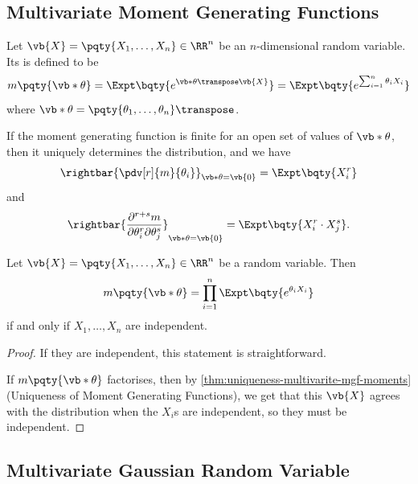 \subsection{Multivariate Moment Generating Functions}

\begin{definition}
    \label{def:multivariate-mgf}%
    Let \(\vb{X} = \pqty{X_1, \ldots, X_n} \in \RR^n\) be an \(n\)-dimensional random variable. Its  is defined to be
    \[
        m\pqty{\vb*{\theta}} = \Expt\bqty{e^{\vb*{\theta}\transpose \vb{X}}} = \Expt\bqty{e^{\sum_{i = 1}^{n} \theta_i X_i}}
    \]
    where \(\vb*{\theta} = \pqty{\theta_1, \ldots, \theta_n} \transpose\).
\end{definition}

\begin{theorem}
    \label{thm:uniqueness-multivarite-mgf-moments}%
    If the moment generating function is finite for an open set of values of \(\vb*{\theta}\), then it uniquely determines the distribution, and we have
    \[
        \rightbar{\pdv[r]{m}{\theta_i}}_{\vb*{\theta} = \vb{0}} = \Expt\bqty{X_i^r}
    \]
    and
    \[
        \rightbar{\frac{\partial^{r + s} m}{\partial \theta_i^r \partial \theta_j^s}}_{\vb*{\theta} = \vb{0}} = \Expt\bqty{X_i^r \cdot X_j^s}.
    \]
\end{theorem}

\begin{claim}
    \label{claim:independent-rv-separable-mgf}%
    Let \(\vb{X} = \pqty{X_1, \ldots, X_n} \in \RR^n\) be a random variable. Then
    \[
        m\pqty{\vb*{\theta}} = \prod_{i = 1}^{n} \Expt\bqty{e^{\theta_i X_i}}
    \]
    if and only if \(X_1, \ldots, X_n\) are independent.
\end{claim}

\begin{proof}
    If they are independent, this statement is straightforward.

    If \(m\pqty{\vb*{\theta}}\) factorises, then by \autoref{thm:uniqueness-multivarite-mgf-moments} (Uniqueness of Moment Generating Functions), we get that this \(\vb{X}\) agrees with the distribution when the \(X_i\)s are independent, so they must be independent.
\end{proof}

\subsection{Multivariate Gaussian Random Variable}

